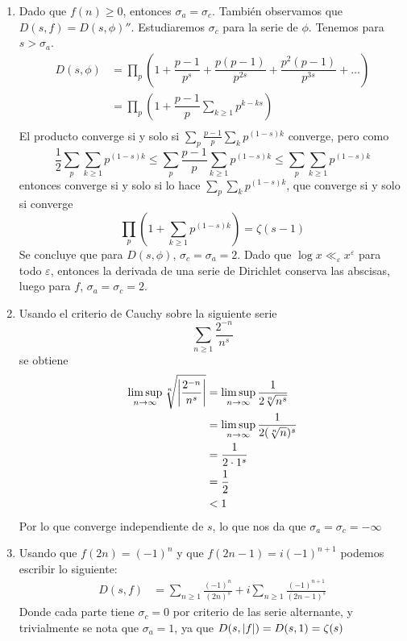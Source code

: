 \begin{sol}
    \begin{enumerate}[label = (\roman*)]
        \item Dado que $f(n) \geq 0$, entonces $\sigma_a = \sigma_c$. También observamos que $D(s,f) = D(s,\phi)''$. Estudiaremos $\sigma_c$ para la serie de $\phi$. Tenemos para $s > \sigma_a$.
        \begin{align*}
            D(s,\phi) &= \prod_p \left(1 + \dfrac{p-1}{p^s} + \dfrac{p(p-1)}{p^{2s}} + \dfrac{p^2(p-1)}{p^{3s}} + \ldots\right)\\
            &=\prod_p \left(1 + \dfrac{p-1}{p}\sum_{k \geq 1} p^{k-ks}\right)\\
        \end{align*}
        El producto converge si y solo si $\sum_p \frac{p-1}{p}\sum_kp^{(1-s)k}$ converge, pero como
        $$\dfrac{1}{2}\sum_p \sum_{k \geq 1}p^{(1-s)k}\leq\sum_p \dfrac{p-1}{p}\sum_{k\geq 1}p^{(1-s)k} \leq \sum_p \sum_{k \geq 1}p^{(1-s)k}$$
        entonces converge si y solo si lo hace $\sum_p \sum_kp^{(1-s)k}$, que converge si y solo si converge
        $$\prod_p \left(1 + \sum_{k \geq 1}p^{(1-s)k}\right) = \zeta(s-1)$$
        Se concluye que para $D(s,\phi)$, $\sigma_c = \sigma_a = 2$. Dado que $\log x \ll_\varepsilon x^\varepsilon$ para todo $\varepsilon$, entonces la derivada de una serie de Dirichlet conserva las abscisas, luego para $f$, $\sigma_a = \sigma_c = 2$.

        \item Usando el criterio de Cauchy sobre la siguiente serie
        \[\sum_{n\geq 1}\frac{2^{-n}}{n^s}\]
        se obtiene
        \begin{align*}
            \limsup_{n\rightarrow\infty}\sqrt[n]{\left|\frac{2^{-n}}{n^s}\right|}&=\limsup_{n\rightarrow\infty}\frac{1}{2\sqrt[n]{n^s}}\\
            &=\limsup_{n\rightarrow\infty}\frac{1}{2(\sqrt[n]{n})^s}\\
            &=\frac{1}{2\cdot1^s}\\
            &=\frac{1}{2}\\
            &<1
        \end{align*}
        Por lo que converge independiente de $s$, lo que nos da que $\sigma_a=\sigma_c=-\infty$

        \item Usando que $f(2n)=(-1)^n$ y que $f(2n-1)=i(-1)^{n+1}$ podemos escribir lo siguiente:
        \begin{align*}
            D(s,f)&=\sum_{n\geq1}\frac{(-1)^n}{(2n)^s}+i\sum_{n\geq1}\frac{(-1)^{n+1}}{(2n-1)^s}
        \end{align*}
        Donde cada parte tiene $\sigma_c=0$ por criterio de las serie alternante, y trivialmente se nota que $\sigma_a=1$, ya que $D(s,\left|f\right|)=D(s,1)=\zeta(s)$
    \end{enumerate}
\end{sol}


